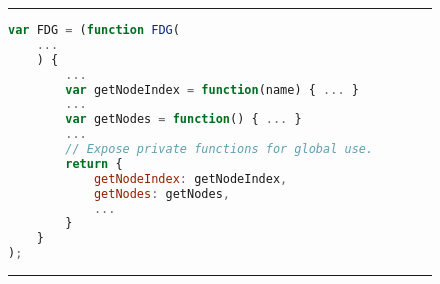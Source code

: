 \begin{figure}[h]
\noindent\rule{\textwidth}{1pt}
\begin{lstlisting}[language=JavaScript, caption={Shows a use of Module pattern in stripped down FDG}, label={lst:module}]
var FDG = (function FDG(
    ...
    ) {
        ...
        var getNodeIndex = function(name) { ... }
        ...
        var getNodes = function() { ... }
        ...
        // Expose private functions for global use.
        return {
            getNodeIndex: getNodeIndex,
            getNodes: getNodes,
            ...
        }
    }
);
\end{lstlisting}
\noindent\rule{\textwidth}{1pt}
\end{figure}
